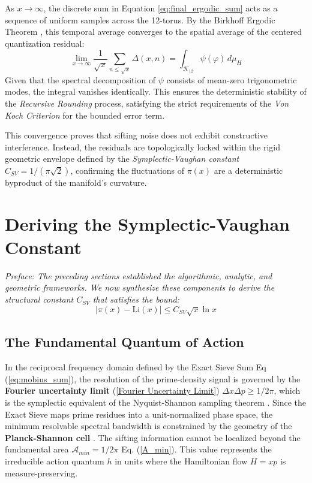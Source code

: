 \documentclass[sn-mathphys-num, pdflatex, referee]{sn-jnl}
\begin{document}
As $x \to \infty$, the discrete sum in Equation \ref{eq:final_ergodic_sum} acts as a sequence of uniform samples across the 12-torus. By the Birkhoff Ergodic Theorem \cite{birkhoff1931proof}, this temporal average converges to the spatial average of the centered quantization residual:
\begin{equation}
\lim_{x \to \infty} \frac{1}{\sqrt{x}} \sum_{n \le \sqrt{x}} \Delta(x, n) = \int_{\mathcal{K}_{12}} \psi(\varphi) \, d\mu_H
\end{equation}
Given that the spectral decomposition of $\psi$ consists of mean-zero trigonometric modes, the integral vanishes identically. This ensures the deterministic stability of the \textit{Recursive Rounding} process, satisfying the strict requirements of the \textit{Von Koch Criterion} for the bounded error term.

This convergence proves that sifting noise does not exhibit constructive interference. Instead, the residuals are topologically locked within the rigid geometric envelope defined by the \textit{Symplectic-Vaughan constant} $C_{SV} = 1/(\pi\sqrt{2})$, confirming the fluctuations of $\pi(x)$ are a deterministic byproduct of the manifold's curvature.

\section{Deriving the Symplectic-Vaughan Constant}
\label{sec:constant}
\textit{Preface: The preceding sections established the algorithmic, analytic, and geometric frameworks. We now synthesize these components to derive the structural constant $C_{SV}$ that satisfies the bound:}
\begin{equation}
|\pi(x) - \text{Li}(x)| \le C_{SV} \sqrt{x} \ln x
\end{equation}

\subsection{The Fundamental Quantum of Action}
\label{sec:action_quantum}

In the reciprocal frequency domain defined by the Exact Sieve Sum Eq (\ref{eq:mobius_sum}), the resolution of the prime-density signal is governed by the \textbf{Fourier   uncertainty limit} (\ref{Fourier Uncertainty Limit}) $\Delta x \Delta p \ge 1/2\pi$, which  is the symplectic equivalent of the Nyquist-Shannon sampling theorem \cite{shannon1949communication}.  Since the Exact Sieve maps prime residues into a unit-normalized phase space, the minimum resolvable spectral bandwidth is constrained by the geometry of the \textbf{ Planck-Shannon cell} \cite{gabor1946theory}. The sifting information cannot be localized beyond the fundamental area $\mathcal{A}_{min}=1/2\pi$ Eq. (\ref{A_min}). This value represents the irreducible action quantum $h$ in units where the Hamiltonian flow $H=xp$ is measure-preserving.
\end{document}
